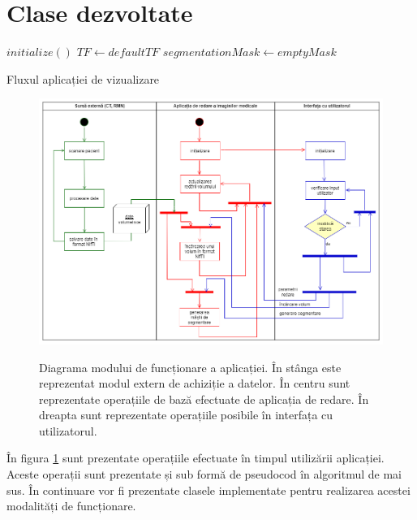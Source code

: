 \section{Clase dezvoltate}

\renewcommand{\thealgocf}{}
\begin{algorithm}[H]
\SetAlgoLined
 $initialize()$\;
 $TF \gets defaultTF$\;
 $segmentationMask \gets emptyMask$\;
 \caption{Fluxul aplicației de vizualizare}
 \label{pseudo_flux}
\end{algorithm}

\begin{figure}[!htb]
    \centering
    \includegraphics[width=16cm]{images/licenta_activity_diagram.drawio.png}
    \\
    \caption{Diagrama modului de funcționare a aplicației. În stânga este reprezentat modul extern de achiziție a datelor. În centru sunt reprezentate operațiile de bază efectuate de aplicația de redare. În dreapta sunt reprezentate operațiile posibile în interfața cu utilizatorul.}
    \label{fig:app_activity_diagram}
\end{figure}

În figura \ref{fig:app_activity_diagram} sunt prezentate operațiile efectuate în timpul utilizării aplicației. Aceste operații sunt prezentate și sub formă de pseudocod în algoritmul de mai sus. În continuare vor fi prezentate clasele implementate pentru realizarea acestei modalități de funcționare. 

